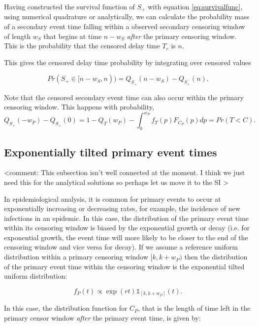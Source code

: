 \documentclass[10pt,letterpaper]{article}
\begin{document}
Having constructed the survival function of $S_+$ with equation \ref{eq:survivalfunc}, using numerical quadrature or analytically, we can calculate the probability mass of a secondary event time falling within a observed secondary censoring window of length $w_S$ that begins at time $n - w_S$ \textit{after} the primary censoring window. This is the probability that the censored delay time $T_c$ is $n$.

This gives the censored delay time probability by integrating over censored values

\begin{equation}
\label{eq:seccensorprob}
Pr(S_+ \in [n - w_S, n)) = Q_{S_+}(n-w_S) - Q_{S_+}(n).
\end{equation}


Note that the censored secondary event time can also occur within the primary censoring window. This happens with probability,
\begin{equation}
Q_{S_+}(-w_P) - Q_{S_+}(0) = 1 - Q_T(w_P) - \int_0^{w_P} f_T(p) F_{C_P}(p) dp = Pr(T< C).
\end{equation}

\subsection{Exponentially tilted primary event times}

<comment: This subsection isn't well connected at the moment. I think we just need this for the analytical solutions so perhaps let us move it to the SI >

In epidemiological analysis, it is common for primary events to occur at exponentially increasing or decreasing rates, for example, the incidence of new infections in an epidemic. In this case, the distribution of the primary event time within its censoring window is biased by the exponential growth or decay \cite{Park2024.01.12.24301247} (i.e. for exponential growth, the event time will more likely to be closer to the end of the censoring window and vice versa for decay). If we assume a reference uniform distribution within a primary censoring window $[k, k + w_P)$ then the distribution of the primary event time within the censoring window is the exponential tilted uniform distribution:

\begin{equation}
f_P(t) \propto \exp(r t) \mathbb{1}_{[k, k + w_P]}(t).
\end{equation}

In this case, the distribution function for $C_P$, that is the length of time left in the primary censor window \textit{after} the primary event time, is given by:
\end{document}
